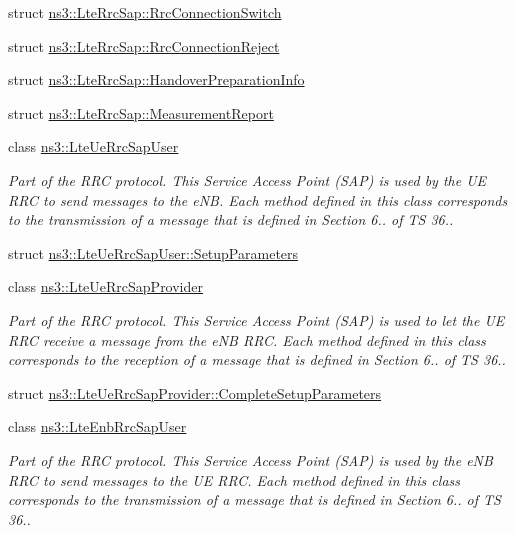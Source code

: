 \begin{DoxyCompactItemize}
struct \hyperlink{structns3_1_1LteRrcSap_1_1RrcConnectionSwitch}{ns3\+::\+Lte\+Rrc\+Sap\+::\+Rrc\+Connection\+Switch}
\item 
struct \hyperlink{structns3_1_1LteRrcSap_1_1RrcConnectionReject}{ns3\+::\+Lte\+Rrc\+Sap\+::\+Rrc\+Connection\+Reject}
\item 
struct \hyperlink{structns3_1_1LteRrcSap_1_1HandoverPreparationInfo}{ns3\+::\+Lte\+Rrc\+Sap\+::\+Handover\+Preparation\+Info}
\item 
struct \hyperlink{structns3_1_1LteRrcSap_1_1MeasurementReport}{ns3\+::\+Lte\+Rrc\+Sap\+::\+Measurement\+Report}
\item 
class \hyperlink{classns3_1_1LteUeRrcSapUser}{ns3\+::\+Lte\+Ue\+Rrc\+Sap\+User}
\begin{DoxyCompactList}\small\item\em Part of the R\+RC protocol. This Service Access Point (S\+AP) is used by the UE R\+RC to send messages to the e\+NB. Each method defined in this class corresponds to the transmission of a message that is defined in Section 6.. of TS 36.. \end{DoxyCompactList}\item 
struct \hyperlink{structns3_1_1LteUeRrcSapUser_1_1SetupParameters}{ns3\+::\+Lte\+Ue\+Rrc\+Sap\+User\+::\+Setup\+Parameters}
\item 
class \hyperlink{classns3_1_1LteUeRrcSapProvider}{ns3\+::\+Lte\+Ue\+Rrc\+Sap\+Provider}
\begin{DoxyCompactList}\small\item\em Part of the R\+RC protocol. This Service Access Point (S\+AP) is used to let the UE R\+RC receive a message from the e\+NB R\+RC. Each method defined in this class corresponds to the reception of a message that is defined in Section 6.. of TS 36.. \end{DoxyCompactList}\item 
struct \hyperlink{structns3_1_1LteUeRrcSapProvider_1_1CompleteSetupParameters}{ns3\+::\+Lte\+Ue\+Rrc\+Sap\+Provider\+::\+Complete\+Setup\+Parameters}
\item 
class \hyperlink{classns3_1_1LteEnbRrcSapUser}{ns3\+::\+Lte\+Enb\+Rrc\+Sap\+User}
\begin{DoxyCompactList}\small\item\em Part of the R\+RC protocol. This Service Access Point (S\+AP) is used by the e\+NB R\+RC to send messages to the UE R\+RC. Each method defined in this class corresponds to the transmission of a message that is defined in Section 6.. of TS 36.. \end{DoxyCompactList}\item 

\end{DoxyCompactItemize}
